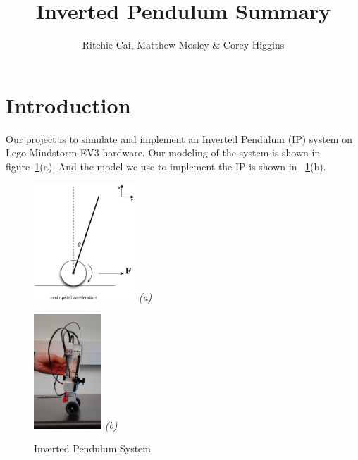 \documentclass{notes}
\author{Ritchie Cai, Matthew Mosley \& Corey Higgins}
\title{Inverted Pendulum Summary}
\begin{document}
\maketitle 
\section{Introduction}
Our project is to simulate and implement an Inverted Pendulum (IP) system on Lego Mindstorm EV3 hardware.
Our modeling of the system is shown in figure~\ref{fig:system_simulation}(a). And the model we use
to implement the IP is shown in ~\ref{fig:system_simulation}(b). 


\begin{figure}[h]
  \begin{center}
    \begin{minipage}[b]{1.5in}
      \mbox{\includegraphics[width=1.5in]{pics/Full_System_2.eps}}
      \mbox{\emph{(a)}}
    \end{minipage}
    \begin{minipage}[b]{1in}
      \mbox{\includegraphics[width=1in]{pics/Lego/Build_side2.eps}}
      \mbox{\emph{(b)}}
    \end{minipage}
  \end{center}
  \caption{Inverted Pendulum System}
  \label{fig:system_simulation}
\end{figure}
\FloatBarrier
\end{document}

